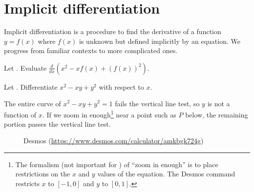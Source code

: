\documentclass[../main.tex]{subfiles}
\begin{document}
 \section{Implicit differentiation}

Implicit differentiation is a procedure to find the derivative of a function \(y = f(x)\) where \(f(x)\) is unknown but defined implicitly by an equation. We progress from familiar contexts to more complicated ones.

\begin{example}
  Let . Evaluate \(\frac{d}{dx}\left(x^{2} - xf(x) + \left(f(x)\right)^{2}\right)\).

\end{example}

\begin{example} \label{eg:implicit-differentiation-intro}
  Let . Differentiate \(x^{2} - xy + y^{2}\) with respect to \(x\).

  \blanks*
\end{example}

The entire curve of \(x^{2} - xy + y^{2} = 1\) fails the vertical line test, so \(y\) is not a function of \(x\). If we zoom in enough\footnote{The formalism (not important for \thiscourse{}) of \enquote{zoom in enough} is to place restrictions on the \(x\) and \(y\) values of the equation. The Desmos command  restricts \(x\) to \([-1,0]\) and \(y\) to \([0,1]\).} near a point such as \(P\) below, the remaining portion passes the vertical line test.

\begin{figure}[H]
  \centering

  
  \qquad
  
  \qquad
  

  \caption{Desmos (\url{https://www.desmos.com/calculator/amkbgk724g})}
\end{figure}
\clearpage
\end{document}
